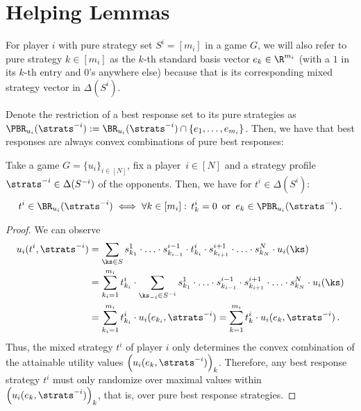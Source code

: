 


\section{Helping Lemmas}
\label{sec:helpinglemmas}

For player $i$ with pure strategy set $S^i = [m_i]$ in a game $G$, we will also refer to pure strategy $k \in [m_i]$ as the $k$-th standard basis vector $e_k \in \R^{m_i}$ (with a $1$ in its $k$-th entry and $0$'s anywhere else) because that is its corresponding mixed strategy vector in $\Delta(S^i)$.

Denote the restriction of a best response set to its pure strategies as $\PBR_{u_i}(\strats^{-i}) :=  \BR_{u_i}(\strats^{-i}) \cap \{e_1, \ldots, e_{m_i}\}$. Then, we have that best responses are always convex combinations of pure best responses:
\begin{lemma*}
\label{app:BR charact}
Take a game $G = \{u_i\}_{i \in [N]}$, fix a player~$i \in [N]$ and a strategy profile $\strats^{-i} \in \Delta(S^{-i})$ of the opponents. Then, we have for $t^i \in \Delta(S^i)$:
\begin{align}
    t^i \in \BR_{u_i}(\strats^{-i}) \iff \forall k \in [m_i] : \,  t_k^i = 0 \, \, \, \textup{or} \, \, \, e_k \in \PBR_{u_i}(\strats^{-i})  \, .
\end{align}
\end{lemma*}
\begin{proof}
We can observe
\begin{align}
\label{convex payoff combi}
\begin{aligned}
    u_i(t^i, \strats^{-i}) &= \sum_{\ks \in S} s_{k_1}^1 \cdot \ldots \cdot s_{k_{i-1}}^{i-1} \cdot t_{k_i}^i \cdot s_{k_{i+1}}^{i+1} \cdot \ldots \cdot s_{k_N}^N \cdot u_i(\ks) 
    \\
    &= \sum_{k_i=1}^{m_i} t_{k_i}^i \cdot \sum_{\ks_{-i} \in S^{-i}} s_{k_1}^1 \cdot \ldots \cdot s_{k_{i-1}}^{i-1} \cdot s_{k_{i+1}}^{i+1} \cdot \ldots \cdot s_{k_N}^N \cdot u_i(\ks) 
    \\
    &= \sum_{k_i=1}^{m_i} t_{k_i}^i \cdot u_i(e_{k_i}, \strats^{-i}) = \sum_{k=1}^{m_i} t_{k}^i \cdot u_i(e_k, \strats^{-i}) \, .
\end{aligned}
\end{align}
Thus, the mixed strategy $t^i$ of player $i$ only determines the convex combination of the attainable utility values $\Big( u_i(e_k, \strats^{-i}) \Big)_k$. Therefore, any best response strategy $t^i$ must only randomize over maximal values within $\Big( u_i(e_k, \strats^{-i}) \Big)_k$, that is, over pure best response strategies.
\end{proof}

